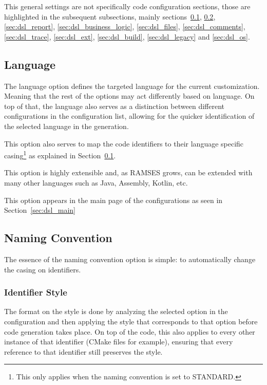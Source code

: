 This general settings are not specifically code configuration sections, those are highlighted in the subsequent subsections, mainly sections~\ref{sec:dsl_lang}, \ref{sec:dsl_name}, \ref{sec:dsl_report}, \ref{sec:dsl_business_logic}, \ref{sec:dsl_files}, \ref{sec:dsl_comments}, \ref{sec:dsl_trace}, \ref{sec:dsl_ext}, \ref{sec:dsl_build}, \ref{sec:dsl_legacy} and \ref{sec:dsl_os}.

\subsection{Language}
\label{sec:dsl_lang}

The language option defines the targeted language for the current customization. Meaning that the rest of the options may act differently based on language. On top of that, the language also serves as a distinction between different configurations in the configuration list, allowing for the quicker identification of the selected language in the generation.

This option also serves to map the code \glspl{identifier} to their language specific casing\footnote{This only applies when the naming convention is set to STANDARD.} as explained in Section~\ref{sec:dsl_lang}.

This option is highly extensible and, as \gls{RAMSES} grows, can be extended with many other languages such as Java, Assembly, Kotlin, etc.

This option appears in the main page of the configurations as seen in Section~\ref{sec:dsl_main}

\subsection{Naming Convention}
\label{sec:dsl_name}

The essence of the naming convention option is simple: to automatically change the casing on \glspl{identifier}.

\subsubsection{Identifier Style}
\label{sec:dsl_name_style}

The format on the style is done by analyzing the selected option in the configuration and then applying the style that corresponds to that option before code generation takes place. On top of the code, this also applies to every other instance of that identifier (CMake files for example), ensuring that every reference to that \gls{identifier} still preserves the style.

